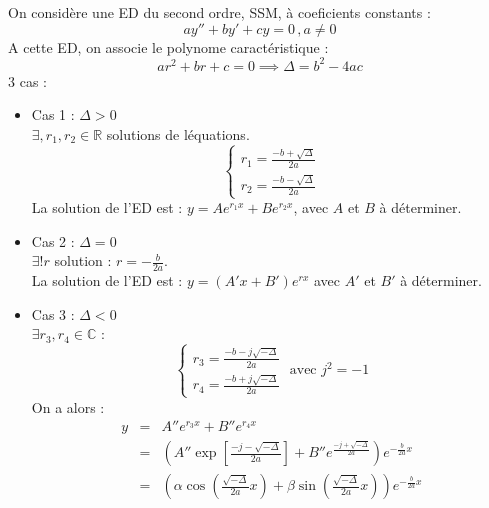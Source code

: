 \begin{theorem}\label{thm:ED2SSM}
        On considère une ED du second ordre, SSM, à coeficients constants : 
        \[
            ay'' + by' + cy = 0 \, , a \neq 0
        \]
        A cette ED, on associe le polynome caractéristique : \\
        \[
            ar^{2}+br+c = 0 \implies \Delta = b^{2}-4ac
        \]
        3 cas :\\
        \begin{itemize}
            \item Cas 1 : \(\Delta >0\)\\
                \(\exists, r_{1}, r_{2} \in \mathbb{R}\) solutions de léquations.\\
                \[
                    \begin{cases}
                        r_{1} = \frac{-b + \sqrt{\Delta}}{2a}\\
                        r_{2} = \frac{-b-\sqrt{\Delta}}{2a}
                    \end{cases}
                \]
                La solution de l'ED est : \(y = A e^{r_{1}x} + B e^{r_{2}x}\), avec \(A\) et \(B\) à déterminer. 
            \item Cas 2 : \(\Delta = 0\)\\
                \(\exists! r\) solution : \(r= -\frac{b}{2a}\).\\
                La solution de l'ED est : \(y = \left( A'x+B' \right)e^{rx}\) avec \(A'\) et \(B'\) à déterminer.
            \item Cas 3 : \(\Delta <0\) \\
                \(\exists r_{3}, r_{4} \in \mathbb{C}\) : \\
                \[
                    \begin{cases}
                        r_{3} = \frac{-b-j\sqrt{-\Delta }}{2a}\\
                        r_{4} = \frac{-b+j\sqrt{-\Delta}}{2a}
                    \end{cases} \text{ avec } j^{2} = -1
                \] 
                On a alors : 
                \begin{eqnarray*}
                    y &=& A'' e^{r_{3}x}+ B''e^{r_{4}x}\\
                    &=& \left( A'' \exp \left[ \frac{-j-\sqrt{-\Delta}}{2a} \right] + B''e^{\frac{-j+\sqrt{-\Delta }}{2a}} \right)e^{-\frac{b}{2a}x}\\
                    &=& \left( \alpha \cos (\frac{\sqrt{-\Delta}}{2a}x) + \beta \sin (\frac{\sqrt{-\Delta }}{2a}x ) \right)e^{-\frac{b}{2a}x}
                \end{eqnarray*}
        \end{itemize} 
\end{theorem}

